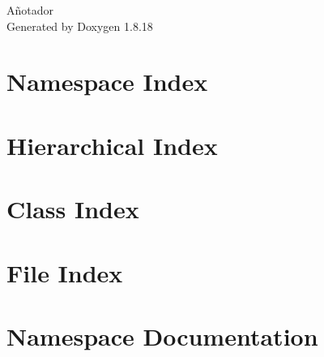 \let\mypdfximage\pdfximage\def\pdfximage{\immediate\mypdfximage}\documentclass[twoside]{book}
\newcommand{\+}{\discretionary{\mbox{\scriptsize$\hookleftarrow$}}{}{}}
\newcommand{\clearemptydoublepage}{%
  \newpage{\pagestyle{empty}\cleardoublepage}%
}
\begin{document}
\hypersetup{pageanchor=false,
             bookmarksnumbered=true,
             pdfencoding=unicode
            }
\begin{titlepage}
\vspace*{7cm}
\begin{center}%
{\Large Añotador }\\
\vspace*{1cm}
{\large Generated by Doxygen 1.8.18}\\
\end{center}
\end{titlepage}
\clearemptydoublepage
{}
\tableofcontents
\clearemptydoublepage
{}
\hypersetup{pageanchor=true}

\chapter{Namespace Index}

\chapter{Hierarchical Index}

\chapter{Class Index}

\chapter{File Index}

\chapter{Namespace Documentation}











\end{document}
